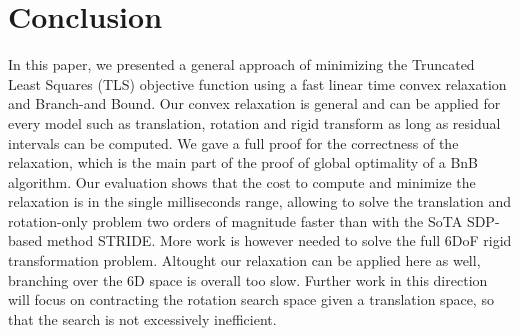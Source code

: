 
\section{Conclusion}
\label{sec:conclusion}

In this paper, we presented a general approach of minimizing the Truncated Least Squares (TLS) objective function 
using a fast linear time convex relaxation and Branch-and Bound. Our convex relaxation is general and can be applied for every model such as translation, rotation and rigid transform as long as residual intervals can be computed. We gave a full proof
for the correctness of the relaxation, which is the main part of the proof of global optimality of a BnB algorithm.
Our evaluation shows that the cost to compute and minimize the relaxation is in the single milliseconds range, allowing to solve the 
translation and rotation-only problem two orders of magnitude faster than with the SoTA SDP-based method STRIDE.
More work is however needed to solve the full 6DoF rigid transformation problem. Altought our relaxation can be applied here as well, branching over the 6D space is overall too slow. Further work in this direction will focus on contracting the rotation search space given a translation space, so that the search is not excessively inefficient. 

